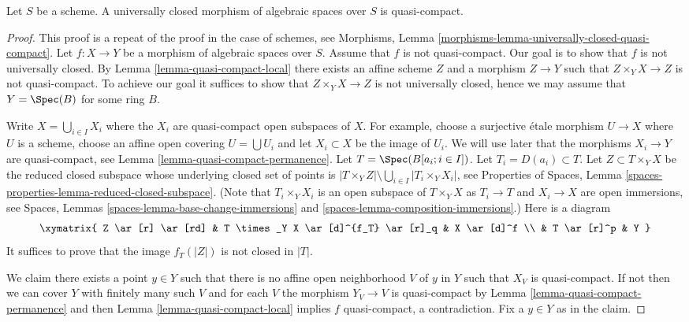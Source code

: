 \begin{lemma}
\label{lemma-universally-closed-quasi-compact}
Let $S$ be a scheme.
A universally closed morphism of algebraic spaces over $S$ is quasi-compact.
\end{lemma}

\begin{proof}
This proof is a repeat of the proof in the case of schemes, see
Morphisms, Lemma \ref{morphisms-lemma-universally-closed-quasi-compact}.
Let $f : X \to Y$ be a morphism of algebraic spaces over $S$.
Assume that $f$ is not quasi-compact.
Our goal is to show that $f$ is not universally closed. By
Lemma \ref{lemma-quasi-compact-local}
there exists an affine scheme $Z$ and a morphism $Z \to Y$
such that $Z \times_Y X \to Z$ is not quasi-compact. To achieve our goal
it suffices to show that $Z \times_Y X \to Z$ is not universally closed,
hence we may assume that $Y = \Spec(B)$ for some ring $B$.

\medskip\noindent
Write $X = \bigcup_{i \in I} X_i$ where the $X_i$ are quasi-compact
open subspaces of $X$. For example, choose a surjective \'etale morphism
$U \to X$ where $U$ is a scheme, choose an affine open covering
$U = \bigcup U_i$ and let $X_i \subset X$ be the image of $U_i$.
We will use later that the morphisms $X_i \to Y$ are quasi-compact, see
Lemma \ref{lemma-quasi-compact-permanence}.
Let $T = \Spec(B[a_i ; i \in I])$. Let $T_i = D(a_i) \subset T$.
Let $Z \subset T \times_Y X$ be the reduced closed subspace whose underlying
closed set of points is
$|T \times_Y Z| \setminus \bigcup_{i \in I} |T_i \times_Y X_i|$, see
Properties of Spaces,
Lemma \ref{spaces-properties-lemma-reduced-closed-subspace}.
(Note that $T_i \times_Y X_i$ is an open subspace of $T \times_Y X$ as
$T_i \to T$ and $X_i \to X$ are open immersions, see
Spaces, Lemmas \ref{spaces-lemma-base-change-immersions} and
\ref{spaces-lemma-composition-immersions}.) Here is a diagram
$$
\xymatrix{
Z \ar[r] \ar[rd] &
T \times_Y X \ar[d]^{f_T} \ar[r]_q &
X \ar[d]^f \\
& T \ar[r]^p & Y
}
$$
It suffices to prove that the image $f_T(|Z|)$ is not closed in $|T|$.

\medskip\noindent
We claim there exists a point $y \in Y$ such that there is no
affine open neighborhood $V$ of $y$ in $Y$ such that $X_V$ is quasi-compact.
If not then we can cover $Y$ with finitely many such $V$ and for
each $V$ the morphism $Y_V \to V$ is quasi-compact by
Lemma \ref{lemma-quasi-compact-permanence}
and then
Lemma \ref{lemma-quasi-compact-local}
implies $f$ quasi-compact, a contradiction. Fix a $y \in Y$ as in the claim.


\end{proof}
